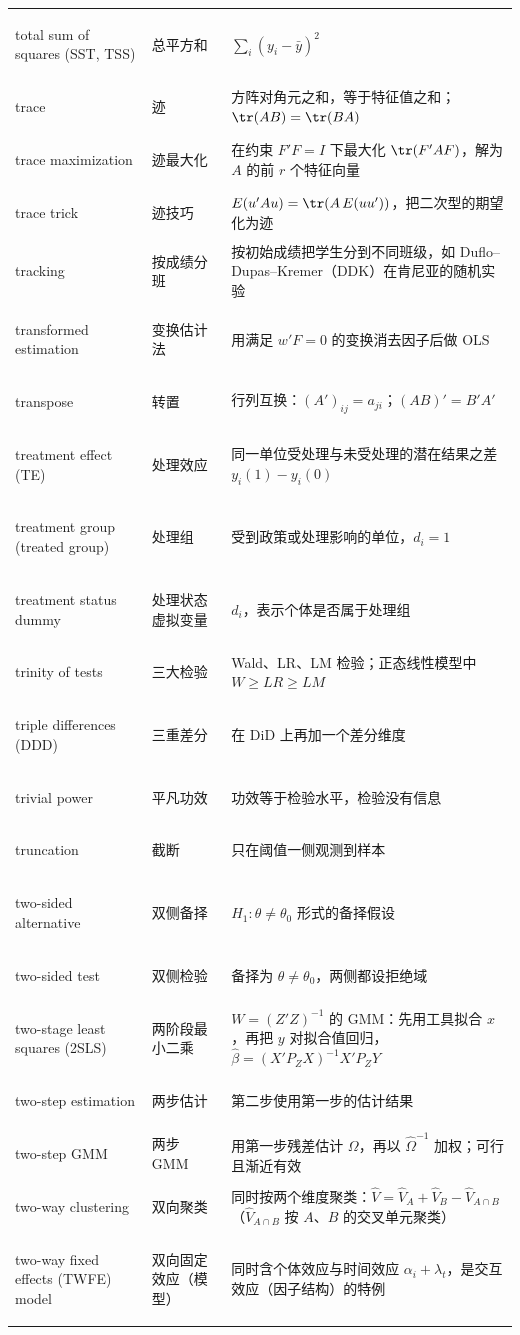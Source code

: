 \begin{longtable}{@{}>{\bfseries\boldmath\raggedright\arraybackslash}p{4.6cm}>{\raggedright\arraybackslash}p{3.2cm}>{\raggedright\arraybackslash}p{\dimexpr\textwidth-7.8cm-4\tabcolsep\relax}@{}}
total sum of squares (SST, TSS) & 总平方和 & $\sum_i(y_i-\bar y)^2$ \\
trace & 迹 & 方阵对角元之和，等于特征值之和；$\tr(AB)=\tr(BA)$ \\
trace maximization & 迹最大化 & 在约束 $F'F=I$ 下最大化 $\tr(F'AF)$，解为 $A$ 的前 $r$ 个特征向量 \\
trace trick & 迹技巧 & $E(u'Au)=\tr(A\,E(uu'))$，把二次型的期望化为迹 \\
tracking & 按成绩分班 & 按初始成绩把学生分到不同班级，如 Duflo--Dupas--Kremer（DDK）在肯尼亚的随机实验 \\
transformed estimation & 变换估计法 & 用满足 $w'F=0$ 的变换消去因子后做 OLS \\
transpose & 转置 & 行列互换：$(A')_{ij}=a_{ji}$；$(AB)'=B'A'$ \\
treatment effect (TE) & 处理效应 & 同一单位受处理与未受处理的潜在结果之差 $y_i(1)-y_i(0)$ \\
treatment group (treated group) & 处理组 & 受到政策或处理影响的单位，$d_i=1$ \\
treatment status dummy & 处理状态虚拟变量 & $d_i$，表示个体是否属于处理组 \\
trinity of tests & 三大检验 & Wald、LR、LM 检验；正态线性模型中 $W\ge LR\ge LM$ \\
triple differences (DDD) & 三重差分 & 在 DiD 上再加一个差分维度 \\
trivial power & 平凡功效 & 功效等于检验水平，检验没有信息 \\
truncation & 截断 & 只在阈值一侧观测到样本 \\
two-sided alternative & 双侧备择 & $H_1:\theta\ne\theta_0$ 形式的备择假设 \\
two-sided test & 双侧检验 & 备择为 $\theta\ne\theta_0$，两侧都设拒绝域 \\
two-stage least squares (2SLS) & 两阶段最小二乘 & $W=(Z'Z)^{-1}$ 的 GMM：先用工具拟合 $x$，再把 $y$ 对拟合值回归，$\hat\beta=(X'P_ZX)^{-1}X'P_ZY$ \\
two-step estimation & 两步估计 & 第二步使用第一步的估计结果 \\
two-step GMM & 两步 GMM & 用第一步残差估计 $\Omega$，再以 $\hat\Omega^{-1}$ 加权；可行且渐近有效 \\
two-way clustering & 双向聚类 & 同时按两个维度聚类：$\hat V=\hat V_A+\hat V_B-\hat V_{A\cap B}$（$\hat V_{A\cap B}$ 按 $A$、$B$ 的交叉单元聚类） \\
two-way fixed effects (TWFE) model & 双向固定效应（模型） & 同时含个体效应与时间效应 $\alpha_i+\lambda_t$，是交互效应（因子结构）的特例 \\

\end{longtable}
